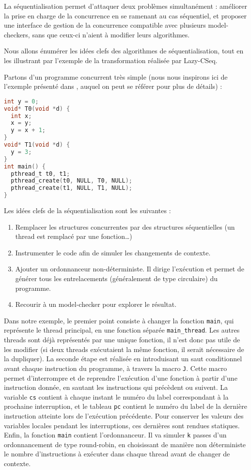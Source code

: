 La séquentialisation permet d'attaquer deux problèmes simultanément : améliorer
la prise en charge de la concurrence en se ramenant au cas séquentiel, et
proposer une interface de gestion de la concurrence compatible avec plusieurs
model-checkers, sans que ceux-ci n'aient à modifier leurs algorithmes.

Nous allons énumérer les idées clefs des algorithmes de séquentialisation, tout
en les illustrant par l'exemple de la transformation réalisée par
Lazy-CSeq\cite{LazyCSeq}.

Partons d'un programme concurrent très simple (nous nous inspirons ici
de l'exemple présenté dans \cite{LazyCSeq}, auquel on peut se
référer pour plus de détails) :

\begin{lstlisting}[language=C]
int y = 0;
void* T0(void *d) {
  int x;
  x = y;
  y = x + 1;
}
void* T1(void *d) {
  y = 3;
}
int main() {
  pthread_t t0, t1;
  pthread_create(t0, NULL, T0, NULL);
  pthread_create(t1, NULL, T1, NULL);
}
\end{lstlisting}

Les idées clefs de la séquentialisation sont les suivantes :

\begin{enumerate}
\def\labelenumi{\arabic{enumi})}
\item
  Remplacer les structures concurrentes par des structures séquentielles
  (un thread est remplacé par une fonction\dots)
\item
  Instrumenter le code afin de simuler les changements de contexte.
\item
  Ajouter un ordonnanceur non-déterministe. Il dirige l'exécution et
  permet de générer tous les entrelacements (généralement de type
  circulaire) du programme.
\item
  Recourir à un model-checker pour explorer le résultat.
\end{enumerate}

Dans notre exemple, le premier point consiste à changer la fonction
\texttt{main}, qui représente le thread principal, en une fonction
séparée \texttt{main\_thread}. Les autres threads sont déjà
représentés par une unique fonction, il n'est donc pas utile de les
modifier (si deux threads exécutaient la même fonction, il serait
nécessaire de la dupliquer). La seconde étape est réalisée en
introduisant un saut conditionnel avant chaque instruction du programme,
à travers la macro \texttt{J}. Cette macro permet d'interrompre et de
reprendre l'exécution d'une fonction à partir d'une instruction donnée,
en sautant les instructions qui précèdent ou suivent. La variable
\texttt{cs} contient à chaque instant le numéro du label
correspondant à la prochaine interruption, et le tableau \texttt{pc}
contient le numéro du label de la dernière instruction atteinte lors de
l'exécution précédente. Pour conserver les valeurs des variables locales
pendant les interruptions, ces dernières sont rendues statiques. Enfin,
la fonction \texttt{main} contient l'ordonnanceur. Il va simuler
\texttt{k} passes d'un ordonnancement de type round-robin, en
choisissant de manière non déterministe le nombre d'instructions à
exécuter dans chaque thread avant de changer de contexte.

